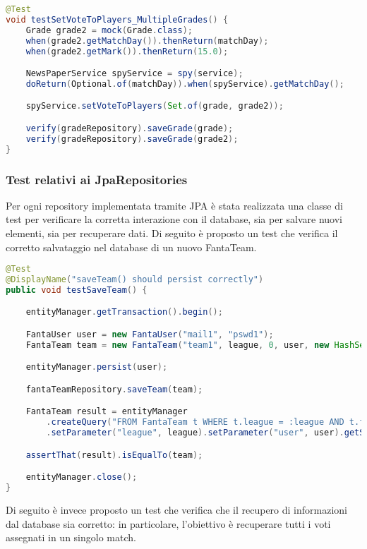 \begin{lstlisting}[language=Java]
@Test
void testSetVoteToPlayers_MultipleGrades() {
	Grade grade2 = mock(Grade.class);
	when(grade2.getMatchDay()).thenReturn(matchDay);
	when(grade2.getMark()).thenReturn(15.0);

	NewsPaperService spyService = spy(service);
	doReturn(Optional.of(matchDay)).when(spyService).getMatchDay();

	spyService.setVoteToPlayers(Set.of(grade, grade2));

	verify(gradeRepository).saveGrade(grade);
	verify(gradeRepository).saveGrade(grade2);
}
\end{lstlisting}


\subsubsection{Test relativi ai JpaRepositories}

Per ogni repository implementata tramite JPA è stata realizzata una classe di test per verificare la 
corretta interazione con il database, sia per salvare nuovi elementi, sia per recuperare dati. 
Di seguito è proposto un test che verifica il corretto salvataggio nel database di un nuovo FantaTeam.

\begin{lstlisting}[language=Java]
@Test
@DisplayName("saveTeam() should persist correctly")
public void testSaveTeam() {

	entityManager.getTransaction().begin();

	FantaUser user = new FantaUser("mail1", "pswd1");
	FantaTeam team = new FantaTeam("team1", league, 0, user, new HashSet<Contract>());

	entityManager.persist(user);

	fantaTeamRepository.saveTeam(team);

	FantaTeam result = entityManager
		.createQuery("FROM FantaTeam t WHERE t.league = :league AND t.fantaManager = :user", FantaTeam.class)
		.setParameter("league", league).setParameter("user", user).getSingleResult();

	assertThat(result).isEqualTo(team);

    entityManager.close();
}
\end{lstlisting}

Di seguito è invece proposto un test che verifica che il recupero di informazioni dal database sia corretto: 
in particolare, l'obiettivo è recuperare tutti i voti assegnati in un singolo match.

